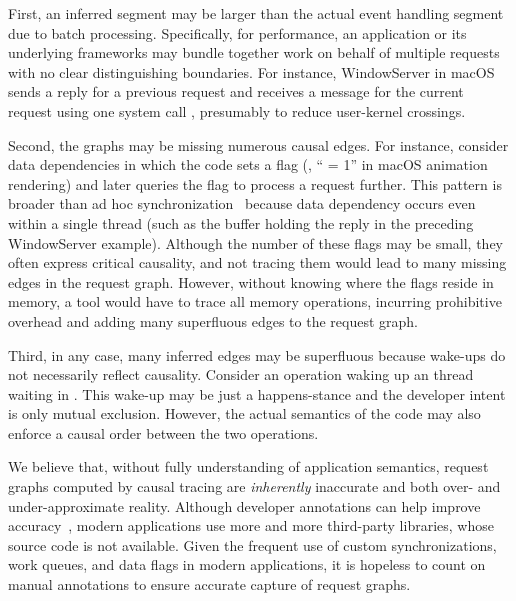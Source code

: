 First, an inferred segment may be larger than the actual event handling segment
due to batch processing. Specifically, for performance, an application or its
underlying frameworks may bundle together work on behalf of multiple requests
with no clear distinguishing boundaries. For instance, WindowServer in macOS
sends a reply for a previous request and receives a message for the current
request using one system call , presumably to
reduce user-kernel crossings.

Second, the graphs may be missing numerous causal edges. For instance, consider
data dependencies in which the code sets a flag (\eg, `` = 1''
in macOS animation rendering) and later queries the flag to process a request
further. This pattern is broader than ad hoc synchronization~\cite{xiong2010ad}
because data dependency occurs even within a single thread (such as the buffer
holding the reply in the preceding WindowServer example). Although the number of
these flags may be small, they often express critical causality, and not tracing
them would lead to many missing edges in the request graph. However, without
knowing where the flags reside in memory, a tool would have to trace all memory
operations, incurring prohibitive overhead and adding many superfluous edges to
the request graph.

Third, in any case, many inferred edges may be superfluous because wake-ups do
not necessarily reflect causality. Consider an  operation waking up
an thread waiting in . This wake-up may be just a happens-stance and
the developer intent is only mutual exclusion. However, the actual semantics of
the code may also enforce a causal order between the two operations.

We believe that, without fully understanding of application semantics, request
graphs computed by causal tracing are \emph{inherently} inaccurate and both
over- and under-approximate reality. Although developer annotations can help
improve accuracy~\cite{reynolds2006pip, fonseca2007x}, modern applications use
more and more third-party libraries, whose source code is not available. 
Given the frequent use of custom synchronizations, work queues, and data flags
in modern applications, it is hopeless to count on manual annotations to ensure
accurate capture of request graphs.

